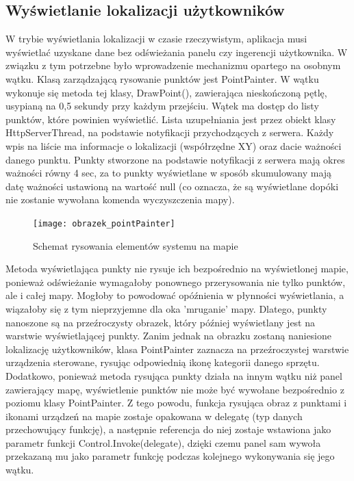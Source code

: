 \subsection{Wyświetlanie lokalizacji użytkowników} W trybie wyświetlania lokalizacji w czasie rzeczywistym, aplikacja musi wyświetlać uzyskane dane bez odświeżania panelu czy ingerencji użytkownika. W związku z tym potrzebne było wprowadzenie mechanizmu opartego na osobnym wątku. Klasą zarządzającą rysowanie punktów jest PointPainter. W wątku wykonuje się metoda tej klasy, DrawPoint(), zawierająca nieskończoną pętlę, usypianą na 0,5 sekundy przy każdym przejściu. Wątek ma dostęp do listy punktów, które powinien wyświetlić. Lista uzupełniania jest przez obiekt klasy HttpServerThread, na podstawie notyfikacji przychodzących z serwera. Każdy wpis na liście ma informacje o lokalizacji (współrzędne XY) oraz dacie ważności danego punktu. Punkty stworzone na podstawie notyfikacji z serwera mają okres ważności równy 4 sec, za to punkty wyświetlane w sposób skumulowany mają datę ważności ustawioną na wartość null (co oznacza, że są wyświetlane dopóki nie zostanie wywołana komenda wyczyszczenia mapy).
\begin{figure}[H]			
	\centering
	\caption{Schemat rysowania elementów systemu na mapie}
	\texttt{[image: obrazek\_pointPainter]}
\end{figure}
Metoda wyświetlająca punkty nie rysuje ich bezpośrednio na wyświetlonej mapie, ponieważ odświeżanie wymagałoby ponownego przerysowania nie tylko punktów, ale i całej mapy. Mogłoby to powodować opóźnienia w płynności wyświetlania, a wiązałoby się z tym nieprzyjemne dla oka 'mruganie' mapy. Dlatego, punkty nanoszone są na przeźroczysty obrazek, który później wyświetlany jest na warstwie wyświetlającej punkty. Zanim jednak na obrazku zostaną naniesione lokalizację użytkowników, klasa PointPainter zaznacza na przeźroczystej warstwie urządzenia sterowane, rysując odpowiednią ikonę kategorii danego sprzętu. Dodatkowo, ponieważ metoda rysująca punkty działa na innym wątku niż panel zawierający mapę, wyświetlenie punktów nie może być wywołane bezpośrednio z poziomu klasy PointPainter. Z tego powodu, funkcja rysująca obraz z punktami i ikonami urządzeń na mapie zostaje opakowana w delegatę (typ danych przechowujący funkcję), a następnie referencja do niej zostaje wstawiona jako parametr funkcji Control.Invoke(delegate), dzięki czemu panel sam wywoła przekazaną mu jako parametr funkcję podczas kolejnego wykonywania się jego wątku.